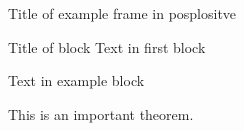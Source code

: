 \begin{frame}{Title of example frame in posplositve}
  \begin{block}{Title of block}
	Text in first block
  \end{block}
  \begin{exampleblock}{}
	Text in example block
  \end{exampleblock}
  \begin{theorem}
	This is an important theorem.
  \end{theorem}
\end{frame}

